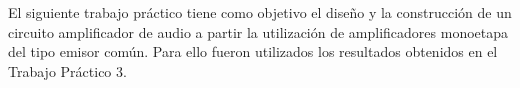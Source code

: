 	El siguiente trabajo práctico tiene como objetivo el diseño y la construcción de un circuito amplificador de audio a partir la utilización de amplificadores monoetapa del tipo emisor común. Para ello fueron utilizados los resultados obtenidos en el Trabajo Práctico 3.


